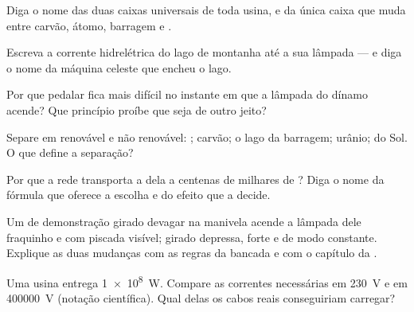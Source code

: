 \begin{exercise}[$\star$]\label{exo:g9:alternator:4}
Diga o nome das duas caixas universais de toda usina, e da única
caixa que muda entre carvão, átomo, barragem e .
\end{exercise}

\begin{exercise}[$\star$]\label{exo:g9:alternator:5}
Escreva a corrente hidrelétrica do lago de montanha até a sua lâmpada
--- e diga o nome da máquina celeste que encheu o lago.
\end{exercise}

\begin{exercise}[$\star$]\label{exo:g9:alternator:6}
Por que pedalar fica mais difícil no instante em que a lâmpada do
dínamo acende? Que princípio proíbe que seja de outro jeito?
\end{exercise}

\begin{exercise}[$\star$]\label{exo:g9:alternator:7}
Separe em renovável e não renovável: ; carvão; o lago da
barragem; urânio;  do Sol. O que define a separação?
\end{exercise}

\begin{exercise}[$\star$]\label{exo:g9:alternator:8}
Por que a rede transporta a  dela a centenas de milhares de
? Diga o nome da fórmula que oferece a escolha e do efeito que a
decide.
\end{exercise}

\begin{exercise}[$\star\star$]\label{exo:g9:alternator:9}
Um  de demonstração girado devagar na manivela acende a
lâmpada dele fraquinho e com piscada visível; girado depressa, forte
e de modo constante. Explique as duas mudanças com as regras da
bancada e com o capítulo da .
\end{exercise}

\begin{exercise}[$\star\star$]\label{exo:g9:alternator:10}
Uma usina entrega \qty{1e8}{W}. Compare as correntes necessárias em
\qty{230}{V} e em \qty{400000}{V} (notação científica). Qual delas os
cabos reais conseguiriam carregar?
\end{exercise}

